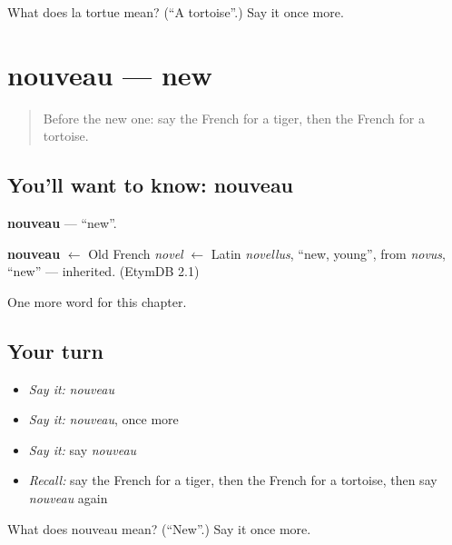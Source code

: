 \begin{tcolorbox}[breakable,colback=teal!4,colframe=teal!35!black,title={Before you move on}]
What does la tortue mean? (\textquotedblleft{}A tortoise\textquotedblright{}.) Say it once more.
\end{tcolorbox}
\section[nouveau]{nouveau — new}

\label{lesson:FR-C89-nouveau}



\begin{quote}
Before the new one: say the French for a tiger, then the French for a tortoise.
\end{quote}

\subsection*{You'll want to know: nouveau}
\textbf{nouveau} — \textquotedblleft{}new\textquotedblright{}.

\begin{cousinweb}
\textbf{nouveau} $\leftarrow$ Old French \emph{novel} $\leftarrow$ Latin \emph{novellus}, \textquotedblleft{}new, young\textquotedblright{}, from \emph{novus}, \textquotedblleft{}new\textquotedblright{} — inherited. (EtymDB 2.1)
\end{cousinweb}

\begin{grammarlens}[title={What you've built}]
One more word for this chapter.
\end{grammarlens}

\subsection*{Your turn}
\begin{itemize}
\raggedright
  \item \emph{Say it:} \emph{nouveau}
  \item \emph{Say it:} \emph{nouveau}, once more
  \item \emph{Say it:} say \emph{nouveau}
  \item \emph{Recall:} say the French for a tiger, then the French for a tortoise, then say \emph{nouveau} again
\end{itemize}

\begin{tcolorbox}[breakable,colback=teal!4,colframe=teal!35!black,title={Before you move on}]
What does nouveau mean? (\textquotedblleft{}New\textquotedblright{}.) Say it once more.
\end{tcolorbox}
